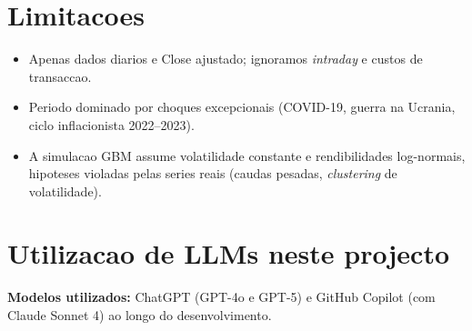 \documentclass[11pt,a4paper]{article}
\begin{document}
\section{Limitacoes}
\begin{itemize}[leftmargin=*]
  \item Apenas dados diarios e Close ajustado; ignoramos
        \emph{intraday} e custos de transaccao.
  \item Periodo dominado por choques excepcionais (COVID-19, guerra
        na Ucrania, ciclo inflacionista 2022--2023).
  \item A simulacao GBM assume volatilidade constante e
        rendibilidades log-normais, hipoteses violadas pelas series
        reais (caudas pesadas, \emph{clustering} de volatilidade).
\end{itemize}

\section{Utilizacao de LLMs neste projecto}

\textbf{Modelos utilizados:} ChatGPT (GPT-4o e GPT-5) e GitHub Copilot
(com Claude Sonnet 4) ao longo do desenvolvimento.
\end{document}
